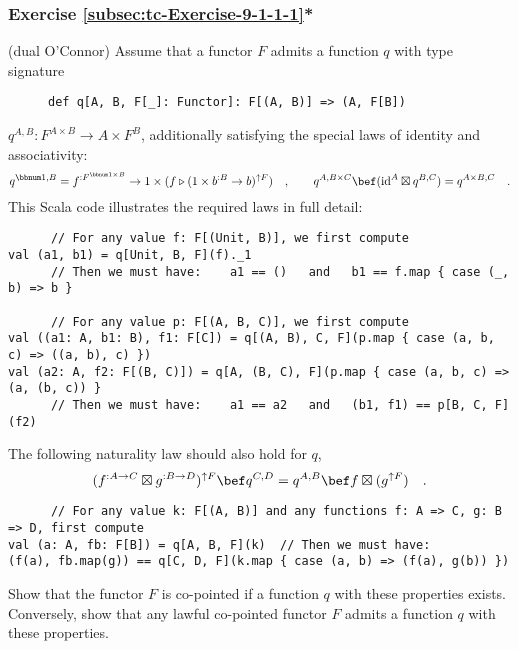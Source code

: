 \subsubsection{Exercise \label{subsec:tc-Exercise-9-1-1-1}\ref{subsec:tc-Exercise-9-1-1-1}{*}}

(dual O\textsf{'}Connor) Assume that a functor $F$
admits a function $q$ with type signature

\begin{wrapfigure}{l}{0.52\columnwidth}%
\vspace{-0.75\baselineskip}
\begin{lstlisting}
def q[A, B, F[_]: Functor]: F[(A, B)] => (A, F[B])
\end{lstlisting}

\vspace{-1.6\baselineskip}
\end{wrapfigure}%

\noindent $q^{A,B}:F^{A\times B}\rightarrow A\times F^{B}$, additionally
satisfying the special laws of identity and associativity:
\[
q^{\bbnum 1,B}=f^{:F^{\bbnum 1\times B}}\rightarrow1\times(f\triangleright(1\times b^{:B}\rightarrow b)^{\uparrow F})\quad,\quad\quad q^{A,B\times C}\bef(\text{id}^{A}\boxtimes q^{B,C})=q^{A\times B,C}\quad.
\]
This Scala code illustrates the required laws in full detail:
\begin{lstlisting}
      // For any value f: F[(Unit, B)], we first compute
val (a1, b1) = q[Unit, B, F](f)._1
      // Then we must have:    a1 == ()   and   b1 == f.map { case (_, b) => b }

      // For any value p: F[(A, B, C)], we first compute
val ((a1: A, b1: B), f1: F[C]) = q[(A, B), C, F](p.map { case (a, b, c) => ((a, b), c) })
val (a2: A, f2: F[(B, C)]) = q[A, (B, C), F](p.map { case (a, b, c) => (a, (b, c)) }
      // Then we must have:    a1 == a2   and   (b1, f1) == p[B, C, F](f2)
\end{lstlisting}
The following naturality law should also hold for $q$,
\[
(f^{:A\rightarrow C}\boxtimes g^{:B\rightarrow D})^{\uparrow F}\bef q^{C,D}=q^{A,B}\bef f\boxtimes(g^{\uparrow F})\quad.
\]
\begin{lstlisting}
      // For any value k: F[(A, B)] and any functions f: A => C, g: B => D, first compute
val (a: A, fb: F[B]) = q[A, B, F](k)  // Then we must have:
(f(a), fb.map(g)) == q[C, D, F](k.map { case (a, b) => (f(a), g(b)) })
\end{lstlisting}
Show that the functor $F$ is co-pointed if a function $q$ with these
properties exists. Conversely, show that any lawful co-pointed functor
$F$ admits a function $q$ with these properties.

